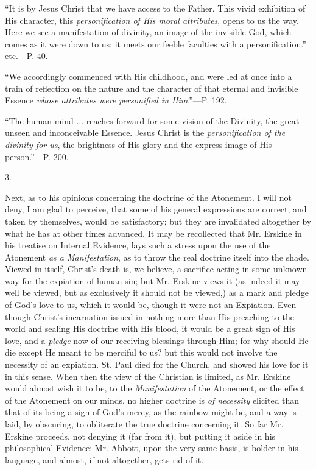 ``It is by Jesus
Christ that we have access to the Father. This vivid exhibition of His
character, this \emph{personification of His moral attributes}, opens
to us the way. Here we see a manifestation of divinity, an image of
the invisible God, which comes as it were down to us; it meets our
feeble faculties with a personification.'' etc.—P. 40.

``We
accordingly commenced with His childhood, and were led at once into a
train of reflection on the nature and the character of that eternal
and invisible Essence \emph{whose attributes were personified in Him}.''—P.
192.

``The human mind
... reaches forward for some vision of the Divinity, the great unseen
and inconceivable Essence. Jesus Christ is the \emph{personification of
the divinity for us}, the brightness of His glory and the express
image of His person.''—P. 200.

3.

Next, as to his opinions concerning the doctrine
of the Atonement. I will not deny, I am glad to perceive, that some of
his general expressions are correct, and taken by themselves, would be
satisfactory; but they are invalidated altogether by what he has at
other times advanced. It may be recollected that Mr. Erskine in his
treatise on Internal Evidence, lays such a stress upon the use of the
Atonement \emph{as a Manifestation}, as to throw the real doctrine
itself into the shade. Viewed in itself, Christ's death is, we
believe, a sacrifice acting in some unknown way for the expiation of
human sin; but Mr. Erskine views it (as indeed it may well be viewed,
but as exclusively it should not be viewed,) as a mark and pledge of
God's love to us, which it would be, though it were not an
Expiation. Even though Christ's incarnation issued in nothing more
than His preaching to the world and sealing His doctrine with His
blood, it would be a great sign of His love, and a \emph{pledge} now
of our receiving blessings through Him; for why should He die except
He meant to be merciful to us? but this would not involve the
necessity of an expiation. St. Paul died for the Church, and showed
his love for it in this sense. When then the view of the Christian is
limited, as Mr. Erskine would almost wish it to be, to the \emph{Manifestation}
of the Atonement, or the effect of the Atonement on our minds, no
higher doctrine is \emph{of necessity} elicited than that of its being
a sign of God's mercy, as the rainbow might be, and a way is laid,
by obscuring, to obliterate the true doctrine concerning it. So far
Mr. Erskine proceeds, not denying it (far from it), but putting it
aside in his philosophical Evidence: Mr. Abbott, upon the very same
basis, is bolder in his language, and almost, if not altogether, gets
rid of it.

